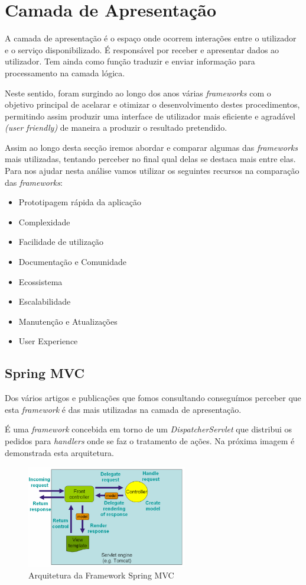 \section{Camada de Apresentação}

A camada de apresentação é o espaço onde ocorrem interações entre o utilizador e o serviço disponibilizado. É responsável por receber e apresentar dados ao utilizador. Tem ainda como função traduzir e enviar informação para processamento na camada lógica.

Neste sentido, foram surgindo ao longo dos anos várias \textit{frameworks} com o objetivo principal de acelarar e otimizar o desenvolvimento destes procedimentos, permitindo assim produzir uma interface de utilizador mais eficiente e agradável \textit{(user friendly)} de maneira a produzir o resultado pretendido.

Assim ao longo desta secção iremos abordar e comparar algumas das \textit{frameworks} mais utilizadas, tentando perceber no final qual delas se destaca mais entre elas. Para nos ajudar nesta análise vamos utilizar os seguintes recursos na comparação das \textit{frameworks}:

\begin{itemize}
  \item Prototipagem rápida da aplicação
  \item Complexidade
  \item Facilidade de utilização
  \item Documentação e Comunidade
  \item Ecossistema
  \item Escalabilidade
  \item Manutenção e Atualizações
  \item User Experience
\end{itemize}

\subsection{Spring MVC} %

Dos vários artigos e publicações que fomos consultando conseguímos perceber que esta \textit{framework} é das mais utilizadas na camada de apresentação.

É uma \textit{framework} concebida em torno de um \textit{DispatcherServlet} que distribui os pedidos para \textit{handlers} onde se faz o tratamento de ações. Na próxima imagem é demonstrada esta arquitetura.

\begin{figure}[ht!]
\centering
\includegraphics[width=70mm]{img/mvc.png}
\caption{Arquitetura da Framework Spring MVC}
\end{figure}

